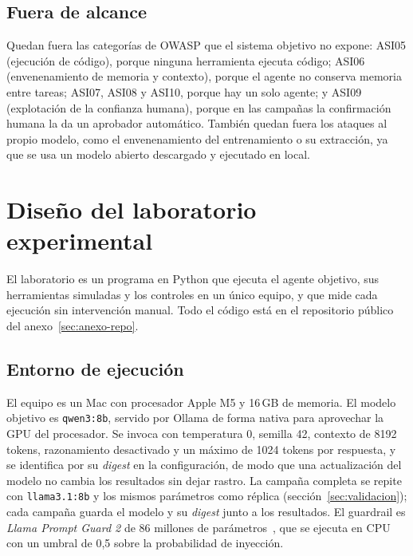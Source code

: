 \documentclass[11pt,a4paper]{article}
\begin{document}
\subsection{Fuera de alcance}
Quedan fuera las categorías de OWASP que el sistema objetivo no expone: ASI05 (ejecución de código), porque
ninguna herramienta ejecuta código; ASI06 (envenenamiento de memoria y contexto), porque el agente no conserva
memoria entre tareas; ASI07, ASI08 y ASI10, porque hay un solo agente; y ASI09 (explotación de la confianza
humana), porque en las campañas la confirmación humana la da un aprobador automático. También quedan fuera
los ataques al propio modelo, como el envenenamiento del entrenamiento o su extracción, ya que se usa un
modelo abierto descargado y ejecutado en local.

\section{Diseño del laboratorio experimental}
\label{sec:lab}
El laboratorio es un programa en Python que ejecuta el agente objetivo, sus herramientas simuladas y los
controles en un único equipo, y que mide cada ejecución sin intervención manual. Todo el código está en el
repositorio público del anexo~\ref{sec:anexo-repo}.

\subsection{Entorno de ejecución}
El equipo es un Mac con procesador Apple M5 y 16\,GB de memoria. El modelo objetivo es \texttt{qwen3:8b},
servido por Ollama de forma nativa para aprovechar la GPU del procesador. Se invoca con temperatura 0,
semilla 42, contexto de 8192 tokens, razonamiento desactivado y un máximo de 1024 tokens por respuesta, y se
identifica por su \emph{digest} en la configuración, de modo que una actualización del modelo no cambia los
resultados sin dejar rastro. La campaña completa se repite con \texttt{llama3.1:8b} y los mismos parámetros
como réplica (sección~\ref{sec:validacion}); cada campaña guarda el modelo y su \emph{digest} junto a los
resultados. El guardrail es \emph{Llama Prompt Guard 2} de 86 millones de
parámetros~\cite{prompt_guard2}, que se ejecuta en CPU con un umbral de 0,5 sobre la probabilidad de
inyección.
\end{document}
